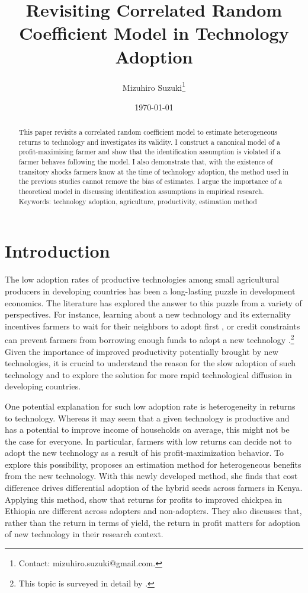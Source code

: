 \documentclass[11pt,letterpaper]{article}
\title{Revisiting Correlated Random Coefficient Model in Technology Adoption}
\author{
  Mizuhiro Suzuki\thanks{
    Contact: mizuhiro.suzuki@gmail.com.
  }
}
\date{\today}
\begin{document}
  
\maketitle
\begin{abstract}
  \singlespacing
    \noindent 
    This paper revisits a correlated random coefficient model to estimate heterogeneous returns to technology and investigates its validity.
    I construct a canonical model of a profit-maximizing farmer and show that the identification assumption is violated if a farmer behaves following the model. 
    I also demonstrate that, with the existence of transitory shocks farmers know at the time of technology adoption, the method used in the previous studies cannot remove the bias of estimates.
    I argue the importance of a theoretical model in discussing identification assumptions in empirical research. \\

  \medskip
  \noindent Keywords: technology adoption, agriculture, productivity, estimation method
\end{abstract}

\newpage

\section{Introduction}

The low adoption rates of productive technologies among small agricultural producers in developing countries has been a long-lasting puzzle in development economics. 
The literature has explored the answer to this puzzle from a variety of perspectives.
For instance, learning about a new technology and its externality incentives farmers to wait for their neighbors to adopt first \citep{foster1995learning, conley2010learning}, or credit constraints can prevent farmers from borrowing enough funds to adopt a new technology \citep{gine2006credit}.\footnote{
  This topic is surveyed in detail by \citet{foster2010microeconomics}.
}
Given the importance of improved productivity potentially brought by new technologies, it is crucial to understand the reason for the slow adoption of such technology and to explore the solution for more rapid technological diffusion in developing countries.

One potential explanation for such low adoption rate is heterogeneity in returns to technology.
Whereas it may seem that a given technology is productive and has a potential to improve income of households on average, this might not be the case for everyone.
In particular, farmers with low returns can decide not to adopt the new technology as a result of his profit-maximization behavior.
To explore this possibility, \citet{Suri11} proposes an estimation method for heterogeneous benefits from the new technology.
With this newly developed method, she finds that cost difference drives differential adoption of the hybrid seeds across farmers in Kenya.
Applying this method, \citet{Michler2019} show that returns for profits to improved chickpea in Ethiopia are different across adopters and non-adopters.
They also discusses that, rather than the return in terms of yield, the return in profit matters for adoption of new technology in their research context.
\end{document}
